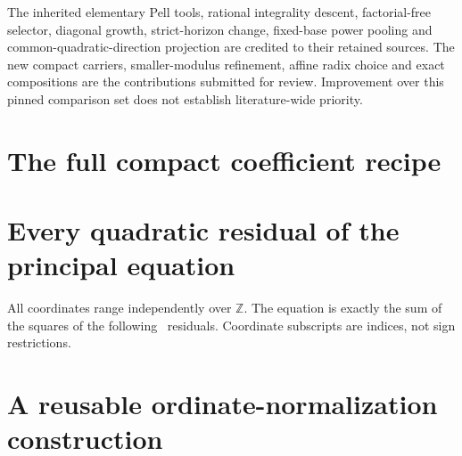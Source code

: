 \documentclass[11pt]{article}
\theoremstyle{remark}\newtheorem{remark}[theorem]{Remark}
\newcommand{\Z}{\mathbb Z}\newcommand{\N}{\mathbb N}
\begin{document}
The inherited elementary Pell tools, rational integrality descent,
factorial-free selector, diagonal growth, strict-horizon change,
fixed-base power pooling and common-quadratic-direction projection
are credited to their retained sources. The new compact carriers,
smaller-modulus refinement, affine radix choice and exact compositions
are the contributions submitted for review. Improvement over this
pinned comparison set does not establish literature-wide priority.



\appendix
\section{The full compact coefficient recipe}\label{app:compact}


\section{Every quadratic residual of the principal equation}\label{app:rows}

All coordinates range independently over $\Z$. The equation is exactly
the sum of the squares of the following \DirectRows\ residuals.
Coordinate subscripts are indices, not sign restrictions.



\section{A reusable ordinate-normalization construction}\label{app:ordinate}

\end{document}
